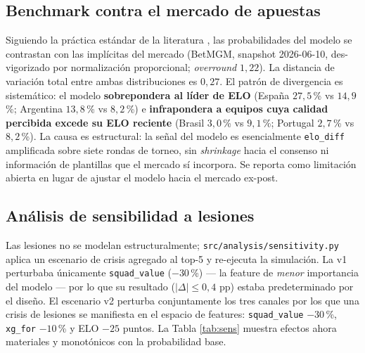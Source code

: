 \documentclass[conference]{IEEEtran}
\begin{document}
\subsection{Benchmark contra el mercado de apuestas}
\label{sec:benchmark}

Siguiendo la pr\'actica est\'andar de la literatura
\cite{dixon1997}, las probabilidades del modelo se contrastan con las
impl\'icitas del mercado (BetMGM, snapshot 2026-06-10, des-vigorizado por
normalizaci\'on proporcional; \emph{overround} $1{,}22$). La distancia de
variaci\'on total entre ambas distribuciones es $0{,}27$. El patr\'on de
divergencia es sistem\'atico: el modelo \textbf{sobrepondera al l\'ider
de ELO} (Espa\~na $27{,}5$\,\% vs $14{,}9$\,\%; Argentina $13{,}8$\,\% vs
$8{,}2$\,\%) e \textbf{infrapondera a equipos cuya calidad percibida
excede su ELO reciente} (Brasil $3{,}0$\,\% vs $9{,}1$\,\%; Portugal
$2{,}7$\,\% vs $8{,}2$\,\%). La causa es estructural: la se\~nal del
modelo es esencialmente \texttt{elo\_diff} amplificada sobre siete rondas
de torneo, sin \emph{shrinkage} hacia el consenso ni informaci\'on de
plantillas que el mercado s\'i incorpora. Se reporta como limitaci\'on
abierta en lugar de ajustar el modelo hacia el mercado ex-post.

\subsection{An\'alisis de sensibilidad a lesiones}

Las lesiones no se modelan estructuralmente;
\texttt{src/analysis/sensitivity.py} aplica un escenario de crisis
agregado al top-5 y re-ejecuta la simulaci\'on. La v1 perturbaba
\'unicamente \texttt{squad\_value} ($-30$\,\%) --- la feature de
\emph{menor} importancia del modelo --- por lo que su resultado
($|\Delta|\!\leq\!0{,}4$ pp) estaba predeterminado por el dise\~no. El
escenario v2 perturba conjuntamente los tres canales por los que una
crisis de lesiones se manifiesta en el espacio de features:
\texttt{squad\_value} $-30$\,\%, \texttt{xg\_for} $-10$\,\% y ELO $-25$
puntos. La Tabla \ref{tab:sens} muestra efectos ahora materiales y
monot\'onicos con la probabilidad base.
\end{document}
